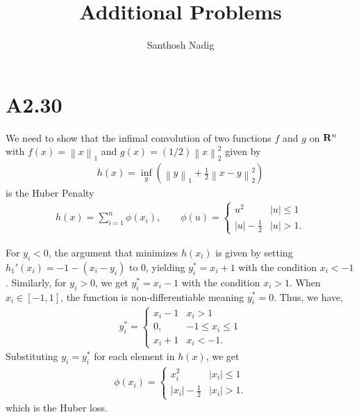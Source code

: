 \documentclass[a4paper,10pt]{article}
\title{Additional Problems}
\author{Santhosh Nadig}
\def\bR{{\bf R}}
\newcommand{\norm}[1]{\left\lVert#1\right\rVert}
\begin{document}
\maketitle

\section*{A2.30}

We need to show that the infimal convolution of two functions  $f$ and  $g$ on $\bR^n$ with $f(x) = \norm{x}_1$ and $g(x) = (1/2) \norm{x}^2_2$ given by
\begin{align*}
h(x) = \inf_{y} (\norm{y}_1 + \frac{1}{2} \norm{x-y}^2_2)
\end{align*}
is the Huber Penalty
\begin{align*}
h(x) = \sum_{i=1}^n \phi(x_i), \qquad \phi(u) = \begin{cases}
u^2 & |u| \le 1 \\
|u| - \frac{1}{2} & |u| > 1.
\end{cases}
\end{align*}

For $y_i < 0$, the argument that minimizes $h(x_i)$ is given by setting $h_1'(x_i) = -1 - (x_i - y_i)$ to 0, yielding $y_i^* = x_i + 1$ with the condition $x_i < -1$. Similarly, for $y_i > 0$,  we get $y_i^* = x_i - 1$ with the condition $x_i > 1$.  When  $x_i \in [-1, 1]$, the function is non-differentiable meaning $y_i^* = 0$. Thus, we have,
\begin{align}
y_i^* = \begin{cases}
x_i - 1 & x_i > 1 \\
0, & -1 \le x_i \le 1 \\
 x_i + 1 & x_i < -1.
\end{cases}
\end{align}
Substituting $y_i = y_i^*$ for each element in $h(x)$, we get
\begin{align}
\phi(x_i)  = \begin{cases}
x_i^2 & |x_i| \le 1 \\
|x_i| - \frac{1}{2} & |x_i| > 1.
\end{cases}
\end{align}
which is the Huber loss.
\end{document}
